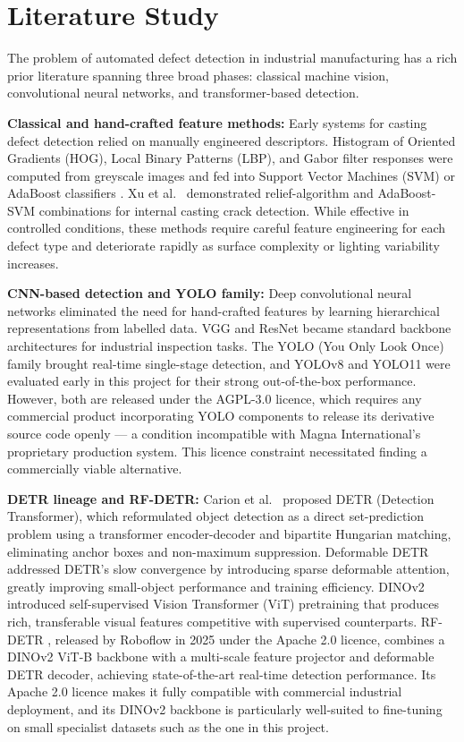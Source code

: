 \section{Literature Study}

The problem of automated defect detection in industrial manufacturing has a rich prior literature spanning three broad phases: classical machine vision, convolutional neural networks, and transformer-based detection.

\textbf{Classical and hand-crafted feature methods:} Early systems for casting defect detection relied on manually engineered descriptors. Histogram of Oriented Gradients (HOG), Local Binary Patterns (LBP), and Gabor filter responses were computed from greyscale images and fed into Support Vector Machines (SVM) or AdaBoost classifiers \cite{xu2020}. Xu et al.\ \cite{xu2020} demonstrated relief-algorithm and AdaBoost-SVM combinations for internal casting crack detection. While effective in controlled conditions, these methods require careful feature engineering for each defect type and deteriorate rapidly as surface complexity or lighting variability increases.

\textbf{CNN-based detection and YOLO family:} Deep convolutional neural networks eliminated the need for hand-crafted features by learning hierarchical representations from labelled data. VGG \cite{simonyan2014} and ResNet \cite{he2016} became standard backbone architectures for industrial inspection tasks. The YOLO (You Only Look Once) family \cite{redmon2016, bochkovskiy2020, jocher2022} brought real-time single-stage detection, and YOLOv8 and YOLO11 were evaluated early in this project for their strong out-of-the-box performance. However, both are released under the AGPL-3.0 licence, which requires any commercial product incorporating YOLO components to release its derivative source code openly --- a condition incompatible with Magna International's proprietary production system. This licence constraint necessitated finding a commercially viable alternative.

\textbf{DETR lineage and RF-DETR:} Carion et al.\ \cite{carion2020} proposed DETR (Detection Transformer), which reformulated object detection as a direct set-prediction problem using a transformer encoder-decoder and bipartite Hungarian matching, eliminating anchor boxes and non-maximum suppression. Deformable DETR \cite{zhu2020} addressed DETR's slow convergence by introducing sparse deformable attention, greatly improving small-object performance and training efficiency. DINOv2 \cite{oquab2023} introduced self-supervised Vision Transformer (ViT) pretraining that produces rich, transferable visual features competitive with supervised counterparts. RF-DETR \cite{robinson2025}, released by Roboflow in 2025 under the Apache 2.0 licence, combines a DINOv2 ViT-B backbone with a multi-scale feature projector and deformable DETR decoder, achieving state-of-the-art real-time detection performance. Its Apache 2.0 licence makes it fully compatible with commercial industrial deployment, and its DINOv2 backbone is particularly well-suited to fine-tuning on small specialist datasets such as the one in this project.

